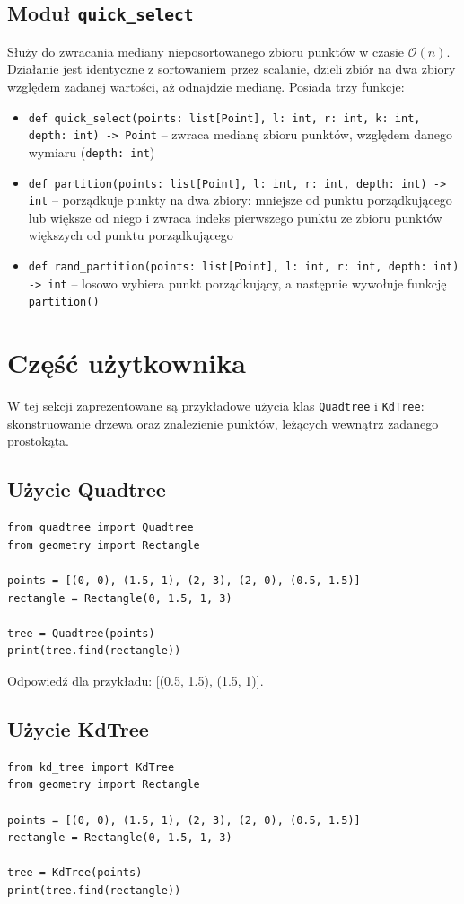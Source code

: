 \documentclass[11pt]{scrartcl}
\newcommand{\sO}{\mathcal O}
\begin{document}
\subsection{Moduł \texttt{quick\_select}}
Służy do zwracania mediany nieposortowanego zbioru punktów w czasie $\sO(n)$. Działanie jest identyczne z sortowaniem przez scalanie, dzieli zbiór na dwa zbiory względem zadanej wartości, aż odnajdzie medianę. Posiada trzy funkcje:
\begin{itemize}
    \item \texttt{def quick\_select(points: list[Point], l: int, r: int, k: int, depth: int) -> Point} -- zwraca medianę zbioru punktów, względem danego wymiaru (\texttt{depth: int})
    \item \texttt{def partition(points: list[Point], l: int, r: int, depth: int) -> int} -- porządkuje punkty na dwa zbiory: mniejsze od punktu porządkującego lub większe od niego i zwraca indeks pierwszego punktu ze zbioru punktów większych od punktu porządkującego
    \item \texttt{def rand\_partition(points: list[Point], l: int, r: int, depth: int) -> int} -- losowo wybiera punkt porządkujący, a następnie wywołuje funkcję \texttt{partition()}
\end{itemize}

\section{Część użytkownika}
W tej sekcji zaprezentowane są przykładowe użycia klas \texttt{Quadtree} i \texttt{KdTree}: skonstruowanie drzewa oraz znalezienie punktów, leżących wewnątrz zadanego prostokąta.

\subsection{Użycie Quadtree}
\begin{verbatim}
from quadtree import Quadtree
from geometry import Rectangle

points = [(0, 0), (1.5, 1), (2, 3), (2, 0), (0.5, 1.5)]
rectangle = Rectangle(0, 1.5, 1, 3)

tree = Quadtree(points)
print(tree.find(rectangle))
\end{verbatim}

Odpowiedź dla przykładu: [(0.5, 1.5), (1.5, 1)].

\subsection{Użycie KdTree}
\begin{verbatim}
from kd_tree import KdTree
from geometry import Rectangle

points = [(0, 0), (1.5, 1), (2, 3), (2, 0), (0.5, 1.5)]
rectangle = Rectangle(0, 1.5, 1, 3)

tree = KdTree(points)
print(tree.find(rectangle))
\end{verbatim}
\end{document}
